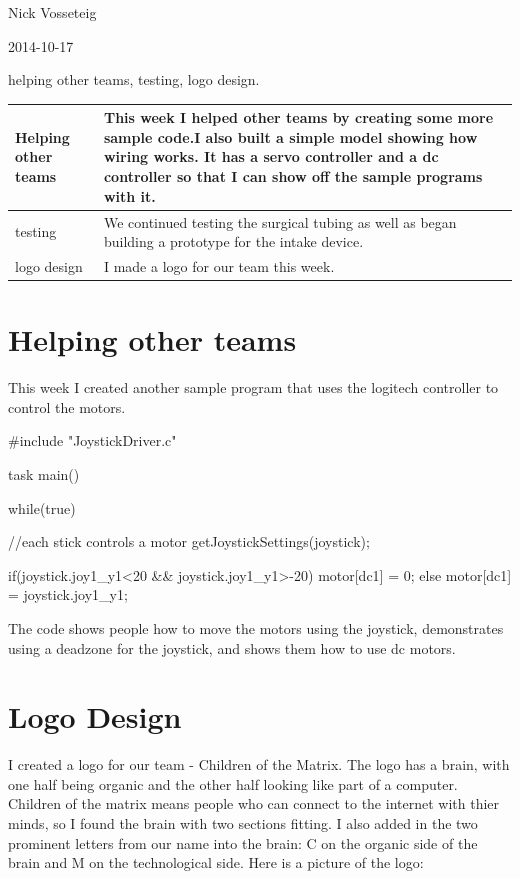 \usepackage{listings}

Nick Vosseteig

2014-10-17

helping other teams, testing, logo design.

\begin{tabular}{|p{5cm}|p{5cm}|}
 \hline
 Helping other teams&
This week I helped other teams by creating some more sample code.I also built a simple model showing how wiring works. It has a servo controller and a dc controller so that I can show off the sample programs with it. 
 \\
 \hline
testing&
We continued testing the surgical tubing as well as began building a prototype for the intake device.
 \\
 \hline
 logo design&
I made a logo for our team this week.
 \\
 \hline
\end{tabular}

\section*{Helping other teams}
This week I created another sample program that uses the logitech controller to control the motors. 
\begin{listing}	
#include "JoystickDriver.c"

task main()
{

	while(true)
	{
		//each stick controls a motor
		getJoystickSettings(joystick);

		if(joystick.joy1_y1<20 && joystick.joy1_y1>-20){
			motor[dc1] = 0;
			}else{
			motor[dc1] = joystick.joy1_y1;
		}
	}
}
\end{listing}
The code shows people how to move the motors using the joystick, demonstrates using a deadzone for the joystick, and shows them how to use dc motors.

\section*{Logo Design}
I created a logo for our team - Children of the Matrix. The logo has a brain, with one half being organic and the other half looking like part of a computer. Children of the matrix means people who can connect to the internet with thier minds, so I found the brain with two sections fitting. I also added in the two prominent letters from our name into the brain: C on the organic side of the brain and M on the technological side.
Here is a picture of the logo:



